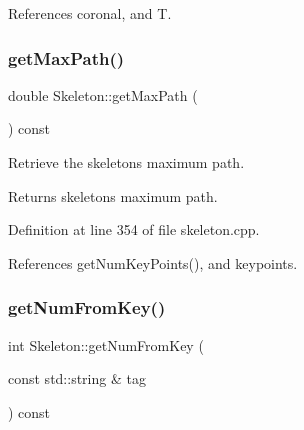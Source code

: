 References coronal, and T.

\mbox{\label{classassistive__rehab_1_1Skeleton_acda9030cd2ed3ad92697418a5e2cff7c}} 
\subsubsection{\texorpdfstring{getMaxPath()}{getMaxPath()}}
{\footnotesize\ttfamily double Skeleton\+::get\+Max\+Path (\begin{DoxyParamCaption}{ }\end{DoxyParamCaption}) const}



Retrieve the skeleton\textquotesingle{}s maximum path. 

\begin{DoxyReturn}{Returns}
skeleton\textquotesingle{}s maximum path. 
\end{DoxyReturn}


Definition at line 354 of file skeleton.\+cpp.


\begin{DoxyCode}{0}

\end{DoxyCode}


References get\+Num\+Key\+Points(), and keypoints.

\mbox{\label{classassistive__rehab_1_1Skeleton_a954bfa99e0dad997ca6d93495246d3f1}} 
\subsubsection{\texorpdfstring{getNumFromKey()}{getNumFromKey()}}
{\footnotesize\ttfamily int Skeleton\+::get\+Num\+From\+Key (\begin{DoxyParamCaption}\item[{const std\+::string \&}]{tag }\end{DoxyParamCaption}) const}




